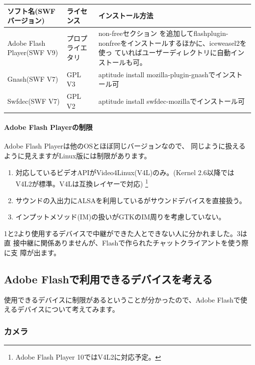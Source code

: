 \documentclass[mingoth,a4paper]{jsarticle}
\begin{document}
\begin{tabular}{llp{20em}}
 ソフト名(SWFバージョン) &ライセンス & インストール方法 \\ \hline
 Adobe Flash Player(SWF V9) & プロプライエタリ & non-freeセクション
         を追加してflashplugin-nonfreeをインストールするほかに、iceweasel2を使っ
         ていればユーザーディレクトリに自動インストールも可。 \\
 Gnash(SWF V7) & GPL V3 & aptitude install
         mozilla-plugin-gnashでインストール可 \\
 Swfdec(SWF V7) & GPL V2 & aptitude install
         swfdec-mozillaでインストール可
\end{tabular}

\paragraph{Adobe Flash Playerの制限}

Adobe Flash Playerは他のOSとほぼ同じバージョンなので、
同じように扱えるように見えますがLinux版には制限があります。

\begin{enumerate}
 \item 対応しているビデオAPIがVideo4Linux(V4L)のみ。(Kernel 2.6以降では
       V4L2が標準。V4Lは互換レイヤーで対応) \footnote{Adobe Flash Player
       10ではV4L2に対応予定。}
 \item サウンドの入出力にALSAを利用しているがサウンドデバイスを直接扱う。
 \item インプットメソッド(IM)の扱いがGTKのIM周りを考慮していない。
\end{enumerate}

1と2より使用するデバイスで中継ができた人とできない人に分かれました。3は直
接中継に関係ありませんが、Flashで作られたチャットクライアントを使う際に支
障が出ます。

\subsection{Adobe Flashで利用できるデバイスを考える}

使用できるデバイスに制限があるということが分かったので、Adobe Flashで使
えるデバイスについて考えてみます。

\subsubsection{カメラ}
\end{document}
